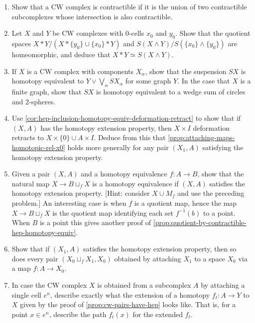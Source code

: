 \begin{enumerate}
\item Show that a CW complex is contractible if it is the union of two contractible
subcomplexes whose intersection is also contractible.

\item Let $X$ and $Y$ be CW complexes with 0-cells $x_0$ and $y_0$. Show that the
quotient spaces $X*Y/(X*\{y_0\} \cup \{x_0\}*Y)$ and
$S(X \wedge Y)/S(\{x_0\} \wedge \{y_0\})$ are homeomorphic, and deduce that
$X*Y \simeq S(X \wedge Y)$.

\item If $X$ is a CW complex with components $X_\alpha$, show that the suspension
$SX$ is homotopy equivalent to $Y \vee \bigvee_\alpha SX_\alpha$ for some graph $Y$. In the case
that $X$ is a finite graph, show that $SX$ is homotopy equivalent to a wedge sum of
circles and 2-spheres.

\item Use \cref{cor:hep-inclusion-homotopy-equiv-deformation-retract} to show that if
$(X,A)$ has the homotopy extension property, then $X \times I$ deformation retracts to
$X \times \{0\} \cup A \times I$. Deduce from this that
\cref{prop:attaching-maps-homotopic-rel-x0} holds more generally for any pair
$(X_1,A)$ satisfying the homotopy extension property.

\item Given a pair $(X,A)$ and a homotopy equivalence $f : A \to B$, show that the
natural map $X \to B \sqcup_f X$ is a homotopy equivalence if $(X,A)$ satisfies the
homotopy extension property. [Hint: consider $X \cup M_f$ and use the preceding
problem.] An interesting case is when $f$ is a quotient map, hence the map
$X \to B \sqcup_f X$ is the quotient map identifying each set $f^{-1}(b)$ to a point. When
$B$ is a point this gives another proof of
\cref{prop:quotient-by-contractible-hep-homotopy-equiv}.

\item Show that if $(X_1,A)$ satisfies the homotopy extension property, then so does
every pair $(X_0 \sqcup_f X_1, X_0)$ obtained by attaching $X_1$ to a space $X_0$ via a
map $f : A \to X_0$.

\item In case the CW complex $X$ is obtained from a subcomplex $A$ by attaching a
single cell $e^n$, describe exactly what the extension of a homotopy $f_t : A \to Y$ to
$X$ given by the proof of \cref{prop:cw-pairs-have-hep} looks like. That is, for a point
$x \in e^n$, describe the path $f_t(x)$ for the extended $f_t$.

\end{enumerate}
